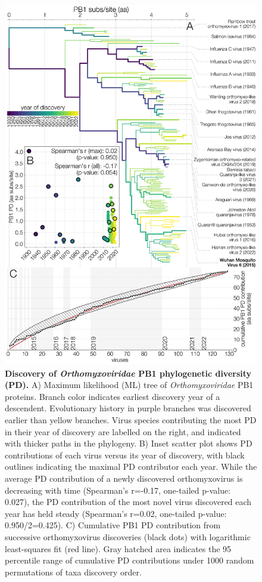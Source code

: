 \documentclass[11pt,twocolumn]{article}
\begin{document}
\begin{figure}%
\centering
\includegraphics[width=0.8\linewidth]{Fig3_contributions.png}
\caption{
\textbf{Discovery of \textit{Orthomyxoviridae} PB1 phylogenetic diversity (PD).}
A) Maximum likelihood (ML) tree of \textit{Orthomyxoviridae} PB1 proteins.
Branch color indicates earliest discovery year of a descendent. Evolutionary history in purple branches was discovered earlier than yellow branches. Virus species contributing the most PD in their year of discovery are labelled on the right, and indicated with thicker paths in the phylogeny.
B) Inset scatter plot shows PD contributions of each virus versus its year of discovery, with black outlines indicating the maximal PD contributor each year.
While the average PD contribution of a newly discovered orthomyxovirus is decreasing with time (Spearman's r=-0.17, one-tailed p-value: 0.027), the PD contribution of the most novel virus discovered each year has held steady (Spearman's r=0.02, one-tailed p-value: 0.950/2=0.425).
C) Cumulative PB1 PD contribution from successive orthomyxovirus discoveries (black dots) with logarithmic least-squares fit (red line).
Gray hatched area indicates the 95 percentile range of cumulative PD contributions under 1000 random permutations of taxa discovery order.
}
\label{fig:contributions}
\end{figure}
\end{document}
